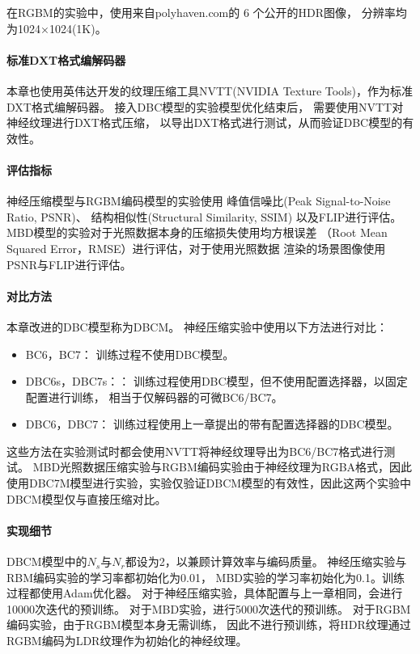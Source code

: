 在RGBM的实验中，使用来自polyhaven.com\cite{PolyHaven}的 6 个公开的HDR图像，
分辨率均为1024×1024(1K)。

\paragraph{标准DXT格式编解码器}

本章也使用英伟达开发的纹理压缩工具NVTT(NVIDIA Texture Tools)，作为标准DXT格式编解码器。
接入DBC模型的实验模型优化结束后，
需要使用NVTT对神经纹理进行DXT格式压缩，
以导出DXT格式进行测试，从而验证DBC模型的有效性。

\paragraph{评估指标}

神经压缩模型与RGBM编码模型的实验使用
峰值信噪比(Peak Signal-to-Noise Ratio, PSNR)、
结构相似性\cite{wang2004image}(Structural Similarity, SSIM)
以及FLIP\cite{andersson2020flip}进行评估。
MBD模型的实验对于光照数据本身的压缩损失使用均方根误差
（Root Mean Squared Error，RMSE）进行评估，对于使用光照数据
渲染的场景图像使用PSNR与FLIP进行评估。


\paragraph{对比方法}

本章改进的DBC模型称为DBCM。
神经压缩实验中使用以下方法进行对比：

\begin{itemize}
    \item BC6，BC7： 训练过程不使用DBC模型。
    \item DBC6s，DBC7s：： 训练过程使用DBC模型，但不使用配置选择器，以固定配置进行训练，
    相当于仅解码器的可微BC6/BC7。
    \item DBC6，DBC7： 训练过程使用上一章提出的带有配置选择器的DBC模型。    
\end{itemize}

这些方法在实验测试时都会使用NVTT将神经纹理导出为BC6/BC7格式进行测试。
MBD光照数据压缩实验与RGBM编码实验由于神经纹理为RGBA格式，因此
使用DBC7M模型进行实验，实验仅验证DBCM模型的有效性，因此这两个实验中
DBCM模型仅与直接压缩对比。

\paragraph{实现细节}

DBCM模型中的$N_s$与$N_r$都设为2，以兼顾计算效率与编码质量。
神经压缩实验与RBM编码实验的学习率都初始化为0.01，
MBD实验的学习率初始化为0.1。训练过程都使用Adam优化器。
对于神经压缩实验，具体配置与上一章相同，会进行10000次迭代的预训练。
对于MBD实验，进行5000次迭代的预训练。
对于RGBM编码实验，由于RGBM模型本身无需训练，
因此不进行预训练，将HDR纹理通过RGBM编码为LDR纹理作为初始化的神经纹理。

